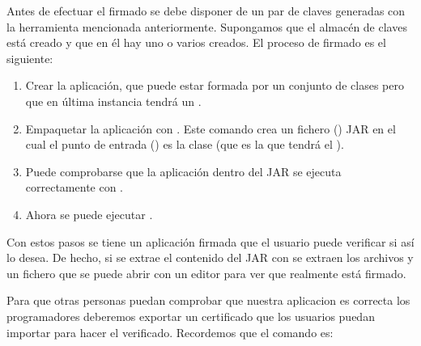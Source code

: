 \documentclass[letterpaper,10pt,spanish]{sphinxmanual}
\begin{document}
Antes de efectuar el firmado se debe disponer de un par de claves generadas con la herramienta  mencionada anteriormente. Supongamos que el almacén de claves está creado y que en él hay uno o varios  creados. El proceso de firmado es el siguiente:
\begin{enumerate}
\def\theenumi{\arabic{enumi}}
\def\labelenumi{\theenumi .}
\makeatletter\def\p@enumii{\p@enumi \theenumi .}\makeatother
\item {} 
Crear la aplicación, que puede estar formada por un conjunto de clases pero que en última instancia tendrá un .

\item {} 
Empaquetar la aplicación con . Este comando crea un fichero () JAR en el cual el punto de entrada () es la clase  (que es la que tendrá el ).

\item {} 
Puede comprobarse que la aplicación dentro del JAR se ejecuta correctamente con .

\item {} 
Ahora se puede ejecutar .

\end{enumerate}

Con estos pasos se tiene un aplicación firmada que el usuario puede verificar si así lo desea. De hecho, si se extrae el contenido del JAR con  se extraen los archivos  y un fichero  que se puede abrir con un editor para ver que realmente está firmado.

Para que otras personas puedan comprobar que nuestra aplicacion es correcta los programadores deberemos exportar un certificado que los usuarios puedan importar para hacer el verificado. Recordemos que el comando es:

%
\begin{sphinxVerbatim}[commandchars=\\\{\}]
   \PYGZbs{}    
\end{sphinxVerbatim}
\end{document}
